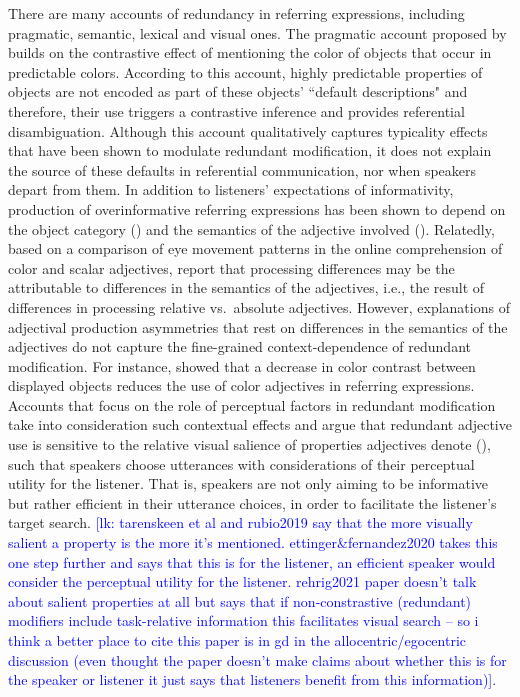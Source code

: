 \documentclass[12pt,letterpaper]{article}
\newcommand{\lk}[1]{\textcolor{Blue}{[lk: #1]}}
\begin{document}
There are many accounts of redundancy in referring expressions, including pragmatic, semantic, lexical and visual ones. The pragmatic account proposed by \citet{Sedivy2003} builds on the contrastive effect of mentioning the color of objects that occur in predictable colors. According to this account, highly predictable properties of objects are not encoded as part of these objects' ``default descriptions" and therefore, their use triggers a contrastive inference and provides referential disambiguation. Although this account qualitatively captures typicality effects that have been shown to modulate redundant modification, it does not explain the source of these defaults in referential communication, nor when speakers depart from them. In addition to listeners' expectations of informativity, production of overinformative referring expressions has been shown to depend on the object category (\citealt{RubioFernandez2016}) and the semantics of the adjective involved (\citealt{RubioEtAl2019, Sedivy2003}). Relatedly, based on a comparison of eye movement patterns in the online comprehension of color and scalar adjectives, \citet{AparicioEtAl2018} report that processing  differences may be the attributable to differences in the semantics of the adjectives, i.e., the result of differences in processing relative vs.~absolute adjectives. However, explanations of adjectival production asymmetries that rest on differences in the semantics of the adjectives do not capture the fine-grained context-dependence of redundant modification. For instance, \citet{ViethenEtAl2017} showed that  a decrease in color contrast between displayed objects reduces the use of color adjectives in referring expressions. Accounts that focus on the role of perceptual factors in redundant modification take into consideration such contextual effects and argue that redundant adjective use is sensitive to the relative visual salience of properties  adjectives denote (\citealt{Taranskeen2015, RubioEtAl2019, EttingerFernandez2020}), such that speakers choose utterances with considerations of their perceptual utility for the listener. That is, speakers are not only aiming to be informative but rather efficient in their utterance choices, in order to facilitate the listener's target search. \lk{tarenskeen et al and rubio2019 say that the more visually salient a property is the more it's mentioned. ettinger\&fernandez2020 takes this one step further and says that this is for the listener, an efficient speaker would consider the perceptual utility for the listener. rehrig2021 paper doesn't talk about salient properties at all but says that if non-constrastive (redundant) modifiers include task-relative information this facilitates visual search -- so i think a better place to cite this paper is in gd in the allocentric/egocentric discussion (even thought the paper doesn't make claims about whether this is for the speaker or listener it just says that listeners benefit from this information)}. 
\end{document}
